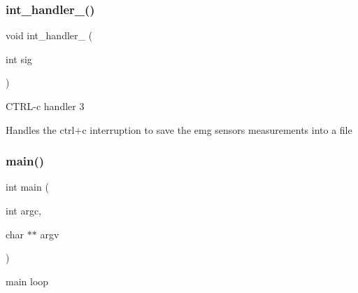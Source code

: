 \subsubsection{int\+\_\+handler\+\_()}
{\footnotesize\ttfamily void int\+\_\+handler\+\_ (\begin{DoxyParamCaption}\item[{int}]{sig }\end{DoxyParamCaption})}

C\+T\+R\+L-\/c handler 3

Handles the ctrl+c interruption to save the emg sensors measurements into a file \mbox{\label{qbadmin_8c_a3c04138a5bfe5d72780bb7e82a18e627}} 
\subsubsection{main()}
{\footnotesize\ttfamily int main (\begin{DoxyParamCaption}\item[{int}]{argc,  }\item[{char $\ast$$\ast$}]{argv }\end{DoxyParamCaption})}

main loop 
